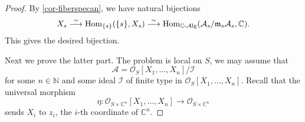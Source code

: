\begin{proof}
    By \cref{cor-fiberspecan}, we have natural bijections
    \[
        X_s\stackrel{\sim}{\longrightarrow} \operatorname{Hom}_{\{s\}}(\{s\},X_s)\stackrel{\sim}{\longrightarrow} \operatorname{Hom}_{\mathbb{C}\text{-}\mathcal{A}\mathrm{lg}}(\mathcal{A}_s/\mathfrak{m}_s\mathcal{A}_s, \mathbb{C}).
    \]  
    This gives the desired bijection.

    Next we prove the latter part. The problem is local on $S$, we may assume that 
    \[
        \mathcal{A}=\mathcal{O}_S[X_1,\ldots,X_n]/\mathcal{I}
    \]  
    for some $n\in \mathbb{N}$ and some ideal $\mathcal{I}$ of finite type in $\mathcal{O}_S[X_1,\ldots,X_n]$. Recall that the universal morphism
    \[
        \eta:\mathcal{O}_{S\times \mathbb{C}^n}[X_1,\ldots,X_n]\rightarrow \mathcal{O}_{S\times \mathbb{C}^n}
    \]
    sends $X_i$ to $z_i$, the $i$-th coordinate of $\mathbb{C}^n$.


\end{proof}
